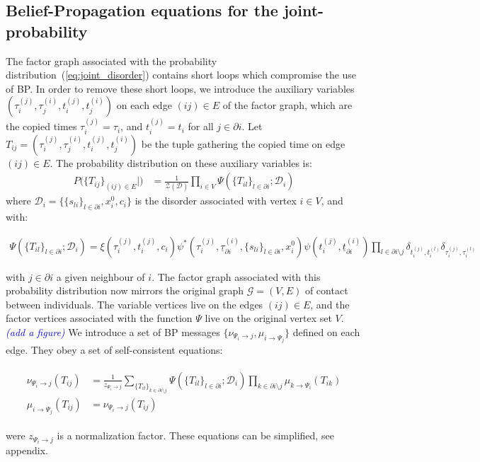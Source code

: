 \documentclass[a4paper, amsfonts, amssymb, amsmath, reprint, showkeys, nofootinbib, twoside, floatfix, pre,superscriptaddress]{revtex4-2}
\begin{document}
\subsection{Belief-Propagation equations for the joint-probability}
The factor graph associated with the probability distribution~(\ref{eq:joint_disorder}) contains short loops which compromise the use of BP. 
In order to remove these short loops, we introduce the auxiliary variables $(\tau_i^{(j)},\tau_j^{(i)},t_i^{(j)},t_j^{(i)})$ on each edge $(ij)\in E$ of the factor graph, which are the copied times $\tau_i^{(j)}=\tau_i$, and $t_i^{(j)}=t_i$ for all $j\in\partial i$.
Let $T_{ij}=(\tau_i^{(j)},\tau_j^{(i)},t_i^{(j)},t_j^{(i)})$ be the tuple gathering the copied time on edge $(ij)\in E$.
The probability distribution on these auxiliary variables is:
\begin{align}
	P(\{T_{ij}\}_{(ij)\in E}|\mathcal) &= \frac{1}{\mathcal{Z}(\mathcal{D})}\prod_{i\in V}\Psi(\{T_{il}\}_{l\in\partial i};\mathcal{D}_i) 
\end{align}
where $\mathcal{D}_i=\{\{s_{li}\}_{l\in\partial i},x_i^0, c_i\}$ is the disorder associated with vertex $i\in V$, and with:
\begin{widetext}
\begin{align}
	\Psi(\{T_{il}\}_{l\in\partial i};\mathcal{D}_i) = \xi(\tau_i^{(j)},t_i^{(j)},c_i)\psi^*(\tau_i^{(j)},\underline{\tau}_{\partial i}^{(i)},\{s_{li}\}_{l\in\partial i},x_i^0)\psi(t_i^{(j)},\underline{t}_{\partial i}^{(i)})\prod_{l\in\partial i\setminus j}\delta_{t_i^{(j)},t_i^{(l)}}\delta_{\tau_i^{(j)},\tau_i^{(l)}}
\end{align}
\end{widetext}
with $j\in\partial i$ a given neighbour of $i$. The factor graph associated with this probability distribution now mirrors the original graph $\mathcal{G}=(V,E)$ of contact between individuals.
The variable vertices live on the edges $(ij)\in E$, and the factor vertices associated with the function $\Psi$ live on the original vertex set $V$. \textcolor{blue}{\it (add a figure)} 
We introduce a set of BP messages $\{\nu_{\Psi_i\to j},\mu_{i\to\Psi_j}\}$ defined on each edge.
They obey a set of self-consistent equations:
\begin{widetext}	
\begin{align}
\label{eq:BP_equations}
\begin{aligned}
	\nu_{\Psi_i\to j}(T_{ij}) &= \frac{1}{z_{\Psi_i\to j}}\sum_{\{T_{il}\}_{k\in\partial i \setminus j}}\Psi(\{T_{il}\}_{l\in\partial i};\mathcal{D}_i)\prod_{k\in\partial i \setminus j}\mu_{k\to\Psi_i}(T_{ik}) \\
	\mu_{i\to \Psi_j}(T_{ij}) &=\nu_{\Psi_i\to j}(T_{ij})
\end{aligned}
\end{align}
\end{widetext}	
were $z_{\Psi_i\to j}$ is a normalization factor. 
These equations can be simplified, see appendix.
\end{document}

